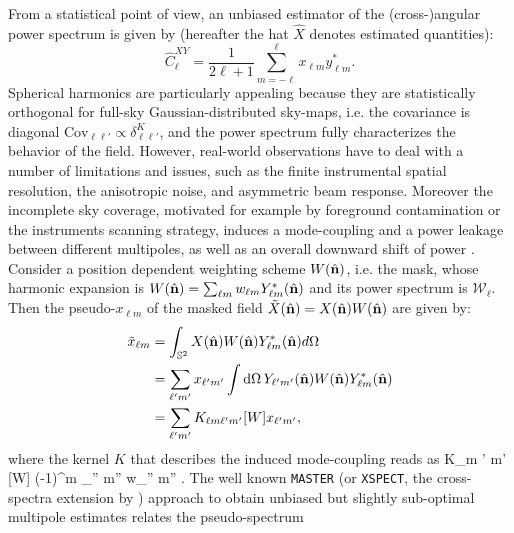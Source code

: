 From a statistical point of view, an unbiased estimator of the (cross-)angular power spectrum is given by (hereafter the hat $\hat{X}$ 
denotes  estimated quantities):
%
\begin{equation}
\label{eq:cl_est}
\hat{C}_{\ell}^{XY} = \frac{1}{2\ell+1}\sum_{m=-\ell}^{\ell} x_{\ell m}y_{\ell m}^*.
\end{equation}
%
Spherical harmonics are particularly appealing because they are statistically orthogonal for full-sky 
Gaussian-distributed sky-maps, i.e. the covariance is diagonal $\text{Cov}_{\ell \ell'}\propto \delta^K_{\ell
\ell'}$, and the power spectrum fully characterizes the behavior of the field. However, real-world observations have to deal with
a number of limitations and issues, such as the finite instrumental spatial resolution, the anisotropic 
noise, and asymmetric beam response. Moreover the incomplete sky coverage, motivated for example 
by foreground contamination or the instruments scanning strategy, induces a mode-coupling and a power leakage between 
different multipoles, as well as an overall downward shift of power \citep{Hivon2001a,Efstathiou2004a}. 
Consider a position dependent weighting scheme $W(\hat{\mathbf{n}})$, i.e. the mask, whose harmonic expansion is $W(\hat{\mathbf{n}})=\sum_{\ell m} w_{\ell m}Y^*_{\ell m}(\hat{\mathbf{n}})$ and its power spectrum is $\mathcal{W}_{\ell}$. Then the pseudo-$x_{\ell m}$ of the masked field $\tilde{X}(\hat{\mathbf{n}})=X(\hat{\mathbf{n}})W(\hat{\mathbf{n}})$ are given by:
%
\begin{equation}
\begin{split}
\tilde{x}_{\ell m} &= \int_{\mathbb{S}^2}X(\hat{\mathbf{n}})W(\hat{\mathbf{n}})Y^*_{\ell m}(\hat{\mathbf{n}})d\Omega \\
&= \sum_{\ell'm'} x_{\ell'm'} \int\mathop{}\!\mathrm{d}\Omega \, Y_{\ell'm'}(\hat{\mathbf{n}}) W(\hat{\mathbf{n}})Y^*_{\ell m}(\hat{\mathbf{n}})\\
&= \sum_{\ell' m'} K_{\ell m \ell' m' }[W] x_{\ell' m'},
\end{split}
\label{eqn:sphcoeffmask}
\end{equation}
%
where the kernel $K$  that describes the induced mode-coupling reads as
%
\be
K_{\ell m \ell' m' }[W]  \equiv (-1)^m \sum_{\ell'' m''} w_{\ell'' m''} .
\ee
%
The well known \texttt{MASTER} \citep{Hivon2001a} (or \texttt{XSPECT}, the cross-spectra extension by \citet{Tristram2005}) approach to obtain unbiased but slightly sub-optimal multipole estimates relates the pseudo-spectrum 
